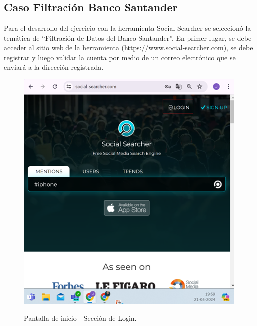 \documentclass[stu, 11pt, letterpaper, donotrepeattitle, floatsintext, natbib]{apa7}
\begin{document}
\subsection{Caso Filtración Banco Santander}

Para el desarrollo del ejercicio con la herramienta Social-Searcher se seleccionó la temática de “Filtración de Datos del Banco Santander”. 
En primer lugar, se debe acceder al sitio web de la herramienta (\url{https://www.social-searcher.com}), se debe registrar y luego validar la cuenta por medio de un correo electrónico que se enviará a la dirección registrada.

\begin{figure}[H]
\centering
\caption{Pantalla de inicio - Sección de Login.}
\includegraphics[width=0.75\linewidth]{osi5.png} %
\label{fig:OverallEffect}
\end{figure}
\end{document}
